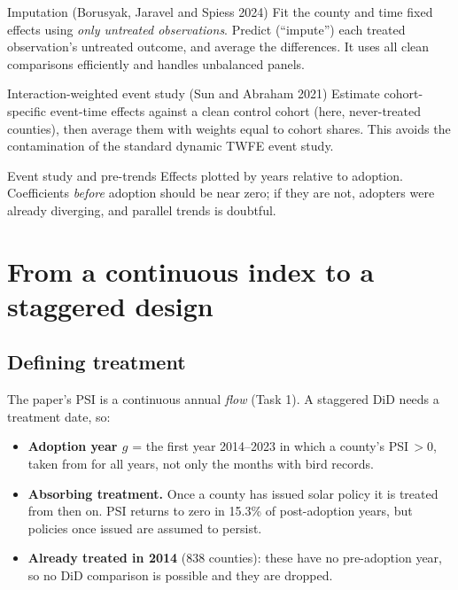 \documentclass[11pt]{article}
\begin{document}
\begin{conceptbox}{Imputation (Borusyak, Jaravel and Spiess 2024)}
Fit the county and time fixed effects using \emph{only untreated observations}. Predict (``impute'') each treated observation's untreated outcome, and average the differences. It uses all clean comparisons efficiently and handles unbalanced panels.
\end{conceptbox}

\begin{conceptbox}{Interaction-weighted event study (Sun and Abraham 2021)}
Estimate cohort-specific event-time effects against a clean control cohort (here, never-treated counties), then average them with weights equal to cohort shares. This avoids the contamination of the standard dynamic TWFE event study.
\end{conceptbox}

\begin{conceptbox}{Event study and pre-trends}
Effects plotted by years relative to adoption. Coefficients \emph{before} adoption should be near zero; if they are not, adopters were already diverging, and parallel trends is doubtful.
\end{conceptbox}

\section{From a continuous index to a staggered design}

\subsection{Defining treatment}
The paper's PSI is a continuous annual \emph{flow} (Task 1). A staggered DiD needs a treatment date, so:
\begin{itemize}
\item \textbf{Adoption year $g$} = the first year 2014--2023 in which a county's PSI\,$>0$, taken from  for all years, not only the months with bird records.
\item \textbf{Absorbing treatment.} Once a county has issued solar policy it is treated from then on. PSI returns to zero in 15.3\% of post-adoption years, but policies once issued are assumed to persist.
\item \textbf{Already treated in 2014} (838 counties): these have no pre-adoption year, so no DiD comparison is possible and they are dropped.
\end{itemize}
\end{document}
